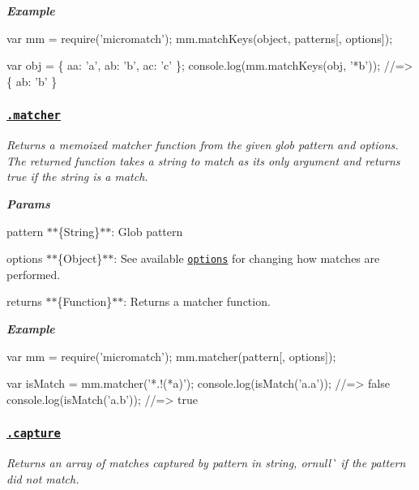 {\itshape {\bfseries Example}}

{\itshape 
\begin{DoxyCode}
var mm = require('micromatch');
mm.matchKeys(object, patterns[, options]);

var obj = \{ aa: 'a', ab: 'b', ac: 'c' \};
console.log(mm.matchKeys(obj, '*b'));
//=> \{ ab: 'b' \}
\end{DoxyCode}
}

{\itshape \subsubsection*{\href{index.js#L461}{\tt .matcher}}}

{\itshape }

{\itshape Returns a memoized matcher function from the given glob {\ttfamily pattern} and {\ttfamily options}. The returned function takes a string to match as its only argument and returns true if the string is a match.}

{\itshape {\bfseries Params}}

{\itshape 
\begin{DoxyItemize}
\item {\ttfamily pattern} $\ast$$\ast$\{String\}$\ast$$\ast$\+: Glob pattern
\item {\ttfamily options} $\ast$$\ast$\{Object\}$\ast$$\ast$\+: See available \href{#options}{\tt options} for changing how matches are performed.
\item {\ttfamily returns} $\ast$$\ast$\{Function\}$\ast$$\ast$\+: Returns a matcher function.
\end{DoxyItemize}}

{\itshape {\bfseries Example}}

{\itshape 
\begin{DoxyCode}
var mm = require('micromatch');
mm.matcher(pattern[, options]);

var isMatch = mm.matcher('*.!(*a)');
console.log(isMatch('a.a'));
//=> false
console.log(isMatch('a.b'));
//=> true
\end{DoxyCode}
}

{\itshape \subsubsection*{\href{index.js#L536}{\tt .capture}}}

{\itshape }

{\itshape Returns an array of matches captured by {\ttfamily pattern} in {\ttfamily string, or}null\`{} if the pattern did not match.}

